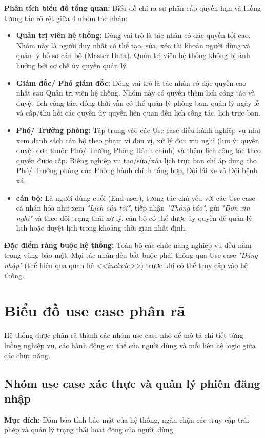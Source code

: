\documentclass[18pt,a4paper]{report}
\begin{document}
\textbf{Phân tích biểu đồ tổng quan:} 
Biểu đồ chỉ ra sự phân cấp quyền hạn và luồng tương tác rõ rệt giữa 4 nhóm tác nhân:
\begin{itemize}[leftmargin=1.2cm]
    \item \textbf{Quản trị viên hệ thống:} Đóng vai trò là tác nhân có đặc quyền tối cao. Nhóm này là người duy nhất có thể tạo, sửa, xóa tài khoản người dùng và quản lý hồ sơ cán bộ (Master Data). Quản trị viên hệ thống không bị ảnh hưởng bởi cơ chế ủy quyền quản lý.
    \item \textbf{Giám đốc/ Phó giám đốc:} Đóng vai trò là tác nhân có đặc quyền cao nhất sau Quản trị viên hệ thống. Nhóm này có quyền thêm lịch công tác và duyệt lịch công tác, đồng thời vẫn có thể quản lý phòng ban, quản lý ngày lễ và cấp/thu hồi các quyền ủy quyền liên quan đến lịch công tác, lịch trực ban.
    \item \textbf{Phó/ Trưởng phòng:} Tập trung vào các Use case điều hành nghiệp vụ như xem danh sách cán bộ theo phạm vi đơn vị, xử lý đơn xin nghỉ (lưu ý: quyền duyệt đơn thuộc Phó/ Trưởng Phòng Hành chính) và thêm lịch công tác theo quyền được cấp. Riêng nghiệp vụ tạo/sửa/xóa lịch trực ban chỉ áp dụng cho Phó/ Trưởng phòng của Phòng hành chính tổng hợp, Đội lái xe và Đội bệnh xá.
    \item \textbf{cán bộ:} Là người dùng cuối (End-user), tương tác chủ yếu với các Use case cá nhân hóa như xem \textit{"Lịch của tôi"}, tiếp nhận \textit{"Thông báo"}, gửi \textit{"Đơn xin nghỉ"} và theo dõi trạng thái xử lý. cán bộ có thể được ủy quyền để quản lý lịch hoặc duyệt lịch trong khoảng thời gian nhất định.
\end{itemize}
\textbf{Đặc điểm ràng buộc hệ thống:} Toàn bộ các chức năng nghiệp vụ đều nằm trong vùng bảo mật. Mọi tác nhân đều bắt buộc phải thông qua Use case \textit{"Đăng nhập"} (thể hiện qua quan hệ \textit{<<include>>}) trước khi có thể truy cập vào hệ thống.

\section{Biểu đồ use case phân rã}
Hệ thống được phân rã thành các nhóm use case nhỏ để mô tả chi tiết từng luồng nghiệp vụ, các hành động cụ thể của người dùng và mối liên hệ logic giữa các chức năng.

\needspace{0.05\textheight}
\subsection{Nhóm use case xác thực và quản lý phiên đăng nhập}
\textbf{Mục đích:} Đảm bảo tính bảo mật của hệ thống, ngăn chặn các truy cập trái phép và quản lý trạng thái hoạt động của người dùng.
\end{document}
